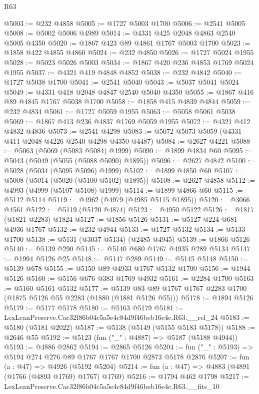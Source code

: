 \begin{lexlean}{R63}
\begin{coremodule}
@5003 := @232 @4858
@5005 := @1727 @5003 @1700
@5006 := @2541 @5005
@5008 := @5002 @5006 @4989
@5014 := @4331 @425 @2048 @4863 @2540 @5005 @4350
@5020 := @1867 @423 @89 @4861 @1767 @5003 @1700
@5023 := @1858 @422 @4855 @4860
@5024 := @232 @4850
@5026 := @1727 @5024 @1955
@5028 := @5023 @5026 @5003
@5034 := @1867 @420 @236 @4853 @1769 @5024 @1955
@5037 := @4321 @419 @4848 @4852
@5038 := @232 @4842
@5040 := @1727 @5038 @1700
@5041 := @2541 @5040
@5043 := @5037 @5041 @5024
@5049 := @4331 @418 @2048 @4847 @2540 @5040 @4350
@5055 := @1867 @416 @89 @4845 @1767 @5038 @1700
@5058 := @1858 @415 @4839 @4844
@5059 := @232 @4834
@5061 := @1727 @5059 @1955
@5063 := @5058 @5061 @5038
@5069 := @1867 @413 @236 @4837 @1769 @5059 @1955
@5072 := @4321 @412 @4832 @4836
@5073 := @2541 @4298
@5083 := @5072 @5073 @5059 (@4331 @411 @2048 @4226 @2540 @4298 @4350 @4487)
@5084 := @2627 @4221
@5088 := @5063 (@5069 (@5083 @5084) @1999)
@5090 := @1899 @4834 @60
@5095 := @5043 (@5049 (@5055 (@5088 @5090) @1895))
@5096 := @2627 @4842
@5100 := @5028 (@5034 (@5095 @5096) @1999)
@5102 := @1899 @4850 @60
@5107 := @5008 (@5014 (@5020 (@5100 @5102) @1895))
@5108 := @2627 @4858
@5112 := @4993 (@4999 (@5107 @5108) @1999)
@5114 := @1899 @4866 @60
@5115 := @5112 @5114
@5119 := @4962 (@4979 (@4985 @5115 @1895))
@5120 := @3066 @4561
@5122 := @5119 (@5120 @4874)
@5123 := @4950 @5122
@5126 := @1817 (@1821 @2283) @1824
@5127 := @1856 @5126
@5131 := @5127 @224 @681 @4936 @1767
@5132 := @232 @4944
@5133 := @1727 @5132
@5134 := @5133 @1700
@5138 := @5131 (@3037 @5134) (@2485 @4945)
@5139 := @1866 @5126
@5140 := @5139 @290
@5145 := @5140 @680 @1767 @4935 @289 @5134
@5147 := @1994 @5126 @25
@5148 := @5147 @289
@5149 := @5145 @5148
@5150 := @5139 @678
@5155 := @5150 @89 @4933 @1767 @5132 @1700
@5156 := @1944 @5126
@5160 := @5156 @676 @383 @1769 @4932
@5161 := @2284 @1700
@5163 := @5160 @5161 @5132
@5177 := @5139 @83 @89 @1767 @1767 @2283 @1700 (@1875 @5126 @55 @2283 (@1880 (@1881 @5126 @55)))
@5178 := @1894 @5126
@5179 := @5177 @5178
@5180 := @5163 @5179
@5181 := LexLeanPreserve.Cac32f86b04c5a5e4c84d9f46beb16e4c.R63.__rel_24
@5183 := @5180 (@5181 @2022)
@5187 := @5138 (@5149 (@5155 @5183 @5178))
@5188 := @2646 @55
@5192 := @5123 (fun ("_" : @4887) => @5187 (@5188 @4944))
@5193 := @4886 @2862
@5194 := @2865 @5126
@5204 := fun ("_" : @5193) => @5194 @274 @276 @89 @1767 @1767 @1700 @2873 @5178 @2876
@5207 := fun (a : @47) => @4926 (@5192 @5204)
@5214 := fun (a : @47) => @4883 (@4891 (@1766 (@4893 @1769) @1767) @1769)
@5216 := @1794 @462 @1798
@5217 := LexLeanPreserve.Cac32f86b04c5a5e4c84d9f46beb16e4c.R63.__fits_10

\end{coremodule}
\end{lexlean}
